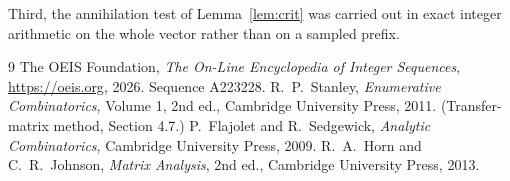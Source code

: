 \documentclass[11pt,a4paper]{article}
\theoremstyle{plain}
\theoremstyle{definition}
\begin{document}
Third, the annihilation test of Lemma~\ref{lem:crit} was carried out in exact integer
arithmetic on the whole vector rather than on a sampled prefix.

\begin{thebibliography}{9}
 The OEIS Foundation, \emph{The On-Line Encyclopedia of Integer
Sequences}, \url{https://oeis.org}, 2026. Sequence A223228.
 R.~P.~Stanley, \emph{Enumerative Combinatorics}, Volume 1, 2nd ed.,
Cambridge University Press, 2011. (Transfer-matrix method, Section 4.7.)
 P.~Flajolet and R.~Sedgewick, \emph{Analytic Combinatorics}, Cambridge
University Press, 2009.
 R.~A.~Horn and C.~R.~Johnson, \emph{Matrix Analysis}, 2nd ed., Cambridge
University Press, 2013.
\end{thebibliography}
\end{document}
